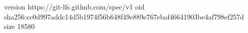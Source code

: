 version https://git-lfs.github.com/spec/v1
oid sha256:ec0d997addc14d5b1974f56b648f49e889e767ebaf46641903be4af798ef257d
size 18580
